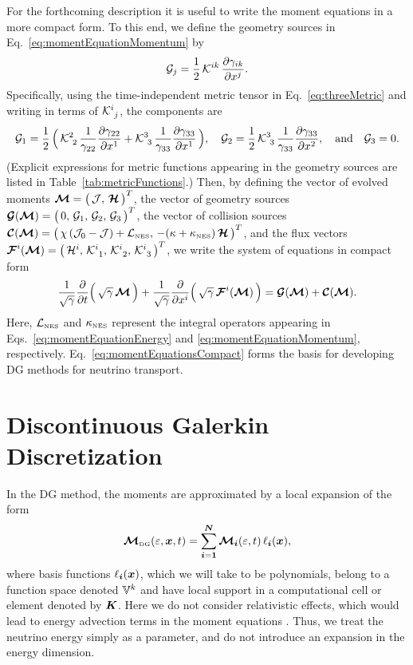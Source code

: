\documentclass[10pt,preprint]{aastex}
\newcommand{\NES}{\mbox{\tiny NES}}
\begin{document}
For the forthcoming description it is useful to write the moment equations in a more compact form.  
To this end, we define the geometry sources in Eq.~\eqref{eq:momentEquationMomentum} by
\begin{equation}
  \mathcal{G}_{j}
  =\frac{1}{2}\,\mathcal{K}^{ik}\,\frac{\partial \gamma_{ik}}{\partial x^{j}}.  
\end{equation}
Specifically, using the time-independent metric tensor in Eq.~\eqref{eq:threeMetric} and writing in terms of $\mathcal{K}^{i}_{~j}$, the components are
\begin{equation}
  \mathcal{G}_{1}
  =\frac{1}{2}\,\Big(\,\mathcal{K}^{2}_{~2}\,\frac{1}{\gamma_{22}}\frac{\partial \gamma_{22}}{\partial x^{1}}+\mathcal{K}^{3}_{~3}\,\frac{1}{\gamma_{33}}\frac{\partial \gamma_{33}}{\partial x^{1}}\,\Big), \quad
  \mathcal{G}_{2}
  =\frac{1}{2}\,\mathcal{K}^{3}_{~3}\,\frac{1}{\gamma_{33}}\frac{\partial \gamma_{33}}{\partial x^{2}}, \quad\text{and}\quad
  \mathcal{G}_{3}
  =0.
\end{equation}
(Explicit expressions for metric functions appearing in the geometry sources are listed in Table~\ref{tab:metricFunctions}.)  
Then, by defining the vector of evolved moments $\boldsymbol{\mathcal{M}}=\big(\,\mathcal{J},\,\boldsymbol{\mathcal{H}}\,\big)^{T}$, the vector of geometry sources $\boldsymbol{\mathcal{G}}(\boldsymbol{\mathcal{M}})=\big(\,0,\,\mathcal{G}_{1},\,\mathcal{G}_{2},\,\mathcal{G}_{3}\,\big)^{T}$, the vector of collision sources $\bcC(\bcM)=\big(\,\chi\,(\cJ_{0}-\cJ)+\cL_{\NES},\,-(\kappa+\kappa_{\NES})\,\bcH\,\big)^{T}$, and the flux vectors $\boldsymbol{\mathcal{F}}^{i}(\boldsymbol{\mathcal{M}})=\big(\,\mathcal{H}^{i},\,\mathcal{K}_{~1}^{i},\,\mathcal{K}_{~2}^{i},\,\mathcal{K}_{~3}^{i}\,\big)^{T}$, we write the system of equations in compact form
\begin{equation}
  \frac{1}{\sqrt{\gamma}}\frac{\partial }{\partial t}\Big(\,\sqrt{\gamma}\,\boldsymbol{\mathcal{M}}\,\Big)
  +\frac{1}{\sqrt{\gamma}}\frac{\partial }{\partial x^{i}}\Big(\,\sqrt{\gamma}\,\boldsymbol{\mathcal{F}}^{i}(\boldsymbol{\mathcal{M}})\,\Big)
  =\boldsymbol{\mathcal{G}}(\boldsymbol{\mathcal{M}})+\boldsymbol{\mathcal{C}}(\boldsymbol{\mathcal{M}}).
  \label{eq:momentEquationsCompact}
\end{equation}
Here, $\cL_{\NES}$ and $\kappa_{\NES}$ represent the integral operators appearing in Eqs.~\eqref{eq:momentEquationEnergy} and \eqref{eq:momentEquationMomentum}, respectively.  
Eq.~\eqref{eq:momentEquationsCompact} forms the basis for developing DG methods for neutrino transport.  

\section{Discontinuous Galerkin Discretization}

In the DG method, the moments are approximated by a local expansion of the form
\begin{equation}
  \boldsymbol{\mathcal{M}}_{\mbox{\tiny DG}}(\varepsilon,\boldsymbol{x},t)
  =\sum_{\boldsymbol{i}=\boldsymbol{1}}^{\boldsymbol{N}}\boldsymbol{\mathcal{M}}_{\boldsymbol{i}}(\varepsilon,t)\,\ell_{\boldsymbol{i}}(\boldsymbol{x}), 
\end{equation}
where basis functions $\ell_{\boldsymbol{i}}(\boldsymbol{x})$, which we will take to be polynomials, belong to a function space denoted $\mathbb{V}^{k}$ and have local support in a computational cell or element denoted by $\boldsymbol{K}$.  
Here we do not consider relativistic effects, which would lead to energy advection terms in the moment equations \citep[cf.][]{cardall_etal_2013a}.  
Thus, we treat the neutrino energy simply as a parameter, and do not introduce an expansion in the energy dimension.  
\end{document}
